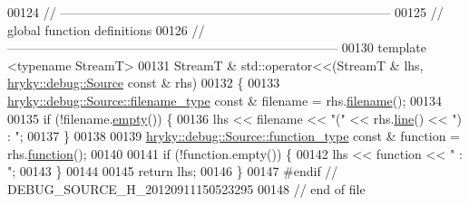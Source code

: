 \begin{DoxyCode}
00124 \textcolor{comment}{//
      ------------------------------------------------------------------------------}
00125 \textcolor{comment}{// global function definitions}
00126 \textcolor{comment}{//
      ------------------------------------------------------------------------------}
00130 \textcolor{comment}{}\textcolor{keyword}{template} <\textcolor{keyword}{typename} StreamT>
00131 StreamT & std::operator<<(StreamT & lhs, \hyperlink{classhryky_1_1debug_1_1_source}{hryky::debug::Source} \textcolor{keyword}{const} & rhs)
00132 \{
00133     \hyperlink{classhryky_1_1_string}{hryky::debug::Source::filename_type} \textcolor{keyword}{const} & filename = rhs.\hyperlink{classhryky_1_1debug_1_1_source_a9873e6e1838a274b3f59ff79a91ed3fa}{filename}();
00134     
00135     \textcolor{keywordflow}{if} (!filename.\hyperlink{classhryky_1_1_string_aff01fafe438f65219695edae5459ed31}{empty}()) \{
00136         lhs << filename << \textcolor{stringliteral}{"("} << rhs.\hyperlink{classhryky_1_1debug_1_1_source_ae8b6fa3524cc94a532dd31e46ff029a0}{line}() << \textcolor{stringliteral}{") : "};
00137     \}
00138 
00139     \hyperlink{classhryky_1_1_string}{hryky::debug::Source::function_type} \textcolor{keyword}{const} & \textcolor{keyword}{function} = rhs.\hyperlink{classhryky_1_1debug_1_1_source_a648474141d21505af7aade64ef62a403}{function}();
00140 
00141     \textcolor{keywordflow}{if} (!\textcolor{keyword}{function}.empty()) \{
00142         lhs << \textcolor{keyword}{function} << \textcolor{stringliteral}{" : "};
00143     \}
00144     
00145     \textcolor{keywordflow}{return} lhs;
00146 \}
00147 \textcolor{preprocessor}{#endif // DEBUG\_SOURCE\_H\_20120911150523295}
00148 \textcolor{preprocessor}{}\textcolor{comment}{// end of file}
\end{DoxyCode}
